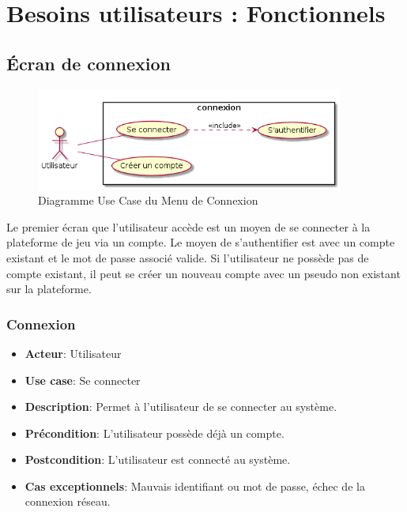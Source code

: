 \documentclass{article}
\begin{document}
\section{Besoins utilisateurs : Fonctionnels}

\subsection{Écran de connexion}

\begin{figure}[!h]
    \centering
    	\includegraphics[width=0.9\textwidth]{uml/usescase/connexion/connexion.png}
    	\caption{Diagramme Use Case du Menu de Connexion}
    	\label{fig:main-menu}
\end{figure}
Le premier écran que l'utilisateur accède est un moyen de se connecter à la plateforme de jeu via un compte. Le moyen de s'authentifier est avec un compte existant et le mot de passe associé valide. Si l'utilisateur ne possède pas de compte existant, il peut se créer un nouveau compte avec un pseudo non existant sur la plateforme.


\subsubsection*{Connexion}
\begin{itemize}
    \item \textbf{Acteur}: Utilisateur
    \item \textbf{Use case}: Se connecter
    \item \textbf{Description}: Permet à l'utilisateur de se connecter au système.
    \item \textbf{Précondition}: L'utilisateur possède déjà un compte.
    \item \textbf{Postcondition}: L'utilisateur est connecté au système.
    \item \textbf{Cas exceptionnels}: Mauvais identifiant ou mot de passe, échec de la connexion réseau.
\end{itemize}
\end{document}
